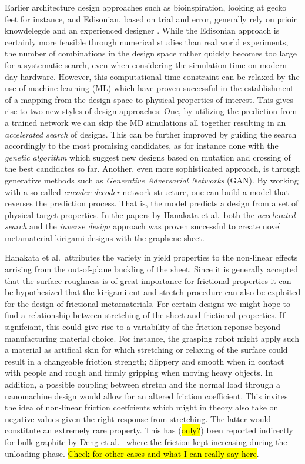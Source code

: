 Earlier architecture design approaches such as bioinspiration, looking at gecko
feet for instance, and Edisonian, based on trial and error, generally rely on
prioir knowdelegde and an experienced designer \cite{Mao}. While the Edisonian
approach is certainly more feasible through numerical studies than real world
experiments, the number of combinations in the design space rather quickly
becomes too large for a systematic search, even when considering the simulation
time on modern day hardware. However, this computational time constraint can be
relaxed by the use of machine learning (\acrshort{ML}) which have proven
successful in the establishment of a mapping from the design space to physical properties of interest. This gives rise to two new styles of design
approaches: One, by utilizing the prediction from a trained network we can skip
the \acrshort{MD} simulations all together resulting in an \textit{accelerated
search} of designs. This can be further improved by guiding the search
accordingly to the most promising candidates, as for instance done with the
\textit{genetic algorithm} which suggest new designs based on mutation and
crossing of the best candidates so far. Another, even more sophisticated
approach, is through generative methods such as \textit{Generative Adversarial
Networks} (GAN). By working with a so-called \textit{encoder-decoder} network
structure, one can build a model that reverses the prediction process. That is,
the model predicts a design from a set of physical target properties. In the
papers by Hanakata et al.\ both the \textit{accelerated search} and the
\textit{inverse design} approach was proven successful to create novel
metamaterial kirigami designs with the graphene sheet. 


Hanakata et al.\ attributes the variety in yield properties to the non-linear
effects arrising from the out-of-plane buckling of the sheet. Since it is
generally accepted that the surface roughness is of great importance for
frictional properties it can be hypothesized that the kirigami cut and stretch
procedure can also be exploited for the design of frictional metamaterials. For
certain designs we might hope to find a relationship between stretching of the
sheet and frictional properties. If signifciant, this could give rise to a
variability of the friction reponse beyond manufacturing material choice. For
instance, the grasping robot might apply such a material as artifical skin for
which stretching or relaxing of the surface could result in a changeable
friction strength; Slippery and smooth when in contact with people and rough and
firmly gripping when moving heavy objects. In addition, a possible coupling
between stretch and the normal load through a nanomachine design would allow for
an altered friction coefficient. This invites the idea of non-linear friction
coeffcients which might in theory also take on negative values given the right
response from stretching. The latter would constitute an extremely rare
property. This has (\hl{only?}) been reported indirectly for bulk graphite by Deng
et al.\ \cite{deng_adhesion-dependent_2012} where the friction kept increasing
during the unloading phase. \hl{Check for other cases and what I can really say
here}.


